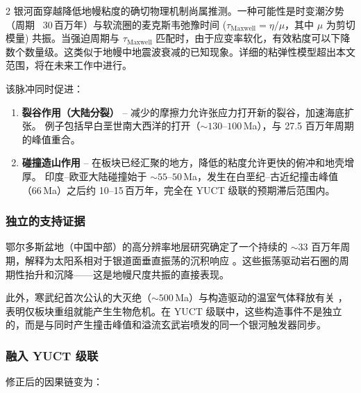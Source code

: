 \documentclass[11pt,a4paper]{article}
\begin{document}
\begin{multicols}{2}
		银河面穿越降低地幔粘度的确切物理机制尚属推测。一种可能性是时变潮汐势（周期 ~30 百万年）与软流圈的麦克斯韦弛豫时间 (\(\tau_{\mathrm{Maxwell}} = \eta/\mu\)，其中 \(\mu\) 为剪切模量) 共振。当强迫周期与 \(\tau_{\mathrm{Maxwell}}\) 匹配时，由于应变率软化，有效粘度可以下降数个数量级。这类似于地幔中地震波衰减的已知现象。详细的粘弹性模型超出本文范围，将在未来工作中进行。
		
		该脉冲同时促进：
		
		\begin{enumerate}
			\item \textbf{裂谷作用（大陆分裂）} – 减少的摩擦力允许张应力打开新的裂谷，加速海底扩张。
			例子包括早白垩世南大西洋的打开（\(\sim 130\)–\(100\) Ma），与 27.5 百万年周期的峰值重合。
			\item \textbf{碰撞造山作用} – 在板块已经汇聚的地方，降低的粘度允许更快的俯冲和地壳增厚。
			印度–欧亚大陆碰撞始于 \(\sim 55\)–\(50\) Ma，发生在白垩纪–古近纪撞击峰值（66 Ma）之后约 10–15 百万年，完全在 YUCT 级联的预期滞后范围内。
		\end{enumerate}
		
		\subsubsection{独立的支持证据}
		
		鄂尔多斯盆地（中国中部）的高分辨率地层研究确定了一个持续的 \(\sim 33\) 百万年周期，解释为太阳系相对于银道面垂直振荡的沉积响应 \cite{Rampino2021}。这些振荡驱动岩石圈的周期性抬升和沉降——这是地幔尺度共振的直接表现。
		
		此外，寒武纪首次公认的大灭绝（\(\sim 500\) Ma）与构造驱动的温室气体释放有关 \cite{Jablonski1991}，表明仅板块重组就能产生生物危机。在 YUCT 级联中，这些构造事件不是独立的，而是与同时产生撞击峰值和溢流玄武岩喷发的同一个银河触发器同步。
		
		\subsubsection{融入 YUCT 级联}
		
		修正后的因果链变为：
		
	\end{multicols}
	
	\vspace{0.3cm}
	\noindent
	\vspace{0.3cm}
	
\end{document}
